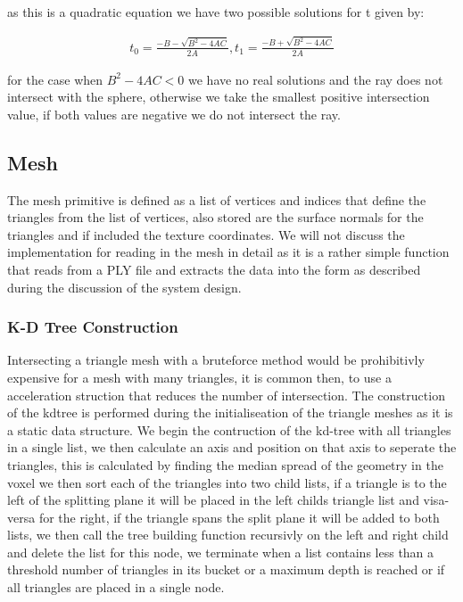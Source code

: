 as this is a quadratic equation we have two possible solutions for t given by:

\begin{align*}
t_0 = \frac{- B - \sqrt{B^2 - 4AC}}{2A}
,
t_1 = \frac{- B + \sqrt{B^2 - 4AC}}{2A}
\end{align*}

for the case when $B^2 - 4AC < 0$ we have no real solutions and the ray does not intersect with the sphere, otherwise we
take the smallest positive intersection value, if both values are negative we do not intersect the ray.

\subsection{Mesh}
The mesh primitive is defined as a list of vertices and indices that define the triangles from the list of vertices, also
stored are the surface normals for the triangles and if included the texture coordinates. We will not discuss the implementation
for reading in the mesh in detail as it is a rather simple function that reads from a PLY file and extracts the data into the
form as described during the discussion of the system design.

\subsubsection{K-D Tree Construction}
\label{sec:obj_mesh}
Intersecting a triangle mesh with a bruteforce method would be prohibitivly expensive for a mesh with many triangles, it
is common then, to use a acceleration struction that reduces the number of intersection. The
construction of the kdtree is performed during the initialiseation of the triangle meshes as it is a static data structure.
We begin the contruction of the kd-tree with all
triangles in a single list, we then calculate an axis and position on that axis to seperate the triangles, this is calculated
by finding the median spread of the geometry in the voxel we then sort each of the triangles into two child lists, if a triangle is
to the left of the splitting plane it will be placed in the left childs triangle list and visa-versa for the right, if the
triangle spans the split plane it will be added to both lists, we then call the tree building function recursivly on the
left and right child and delete the list for this node, we terminate when a list contains less than a threshold number
of triangles in its bucket or a maximum depth is reached or if all triangles are placed in a single node.

